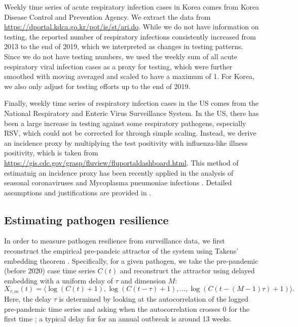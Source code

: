 \documentclass[12pt]{article}
\begin{document}
Weekly time series of acute respiratory infection cases in Korea comes from Korea Disease Control and Prevention Agency.
We extract the data from \url{https://dportal.kdca.go.kr/pot/is/st/ari.do}.
While we do not have information on testing, the reported number of respiratory infections consistently increased from 2013 to the end of 2019, which we interpreted as changes in testing patterns.
Since we do not have testing numbers, we used the weekly sum of all acute respiratory viral infection cases as a proxy for testing, which were further smoothed with moving averaged and scaled to have a maximum of 1.
For Korea, we also only adjust for testing efforts up to the end of 2019.

Finally, weekly time series of respiratory infection cases in the US comes from the National Respiratory and Enteric Virus Surveillance System.
In the US, there has been a large increase in testing against some respiratory pathogens, especially RSV, which could not be corrected for through simple scaling.
Instead, we derive an incidence proxy by multiplying the test positivity with influenza-like illness positivity, which is taken from \url{https://gis.cdc.gov/grasp/fluview/fluportaldashboard.html}.
This method of estimatnig an incidence proxy has been recently applied in the analysis of seasonal coronaviruses \citep{kissler2020projecting} and Mycoplasma pneumoniae infections \citep{park2024predicting}.
Detailed assumptions and justifications are provided in \citep{goldstein2011predicting}.

\subsection*{Estimating pathogen resilience}

In order to measure pathogen resilience from surveillance data, we first reconstruct the empirical pre-pandeic attractor of the system using Takens' embedding theorem \citep{takens2006detecting}.
Specifically, for a given pathogen, we take the pre-pandemic (before 2020) case time series $C(t)$ and reconstruct the attractor using delayed embedding with a uniform delay of $\tau$ and dimension $M$:
\begin{equation}
X_{\tau,m}(t) = \langle\log(C(t)+1), \log(C(t-\tau)+1), \dots, \log(C(t-(M-1)\tau)+1)\rangle.
\end{equation}
Here, the delay $\tau$ is determined by looking at the autocorrelation of the logged pre-pandemic time series and asking when the autocorrelation crosses 0 for the first time \citep{tan2023selecting};
a typical delay for for an annual outbreak is around 13 weeks.
\end{document}
